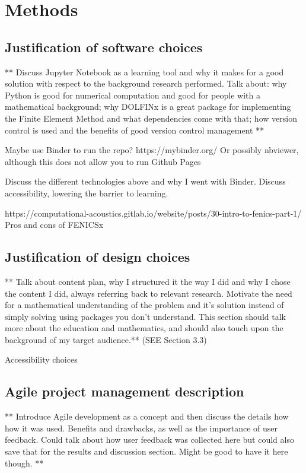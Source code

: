 \chapter{Methods}
\label{chapter2}


\section{Justification of software choices}
** Discuss Jupyter Notebook as a learning tool and why it makes for a good solution with respect to the background research performed. Talk about: why Python is good for numerical computation and good for people with a mathematical background; why DOLFINx is a great package for implementing the Finite Element Method and what dependencies come with that; how version control is used and the benefits of good version control management **

Maybe use Binder to run the repo? https://mybinder.org/
Or possibly nbviewer, although this does not allow you to run
Github Pages

Discuss the different technologies above and why I went with Binder. Discuss accessibility, lowering the barrier to learning.

https://computational-acoustics.gitlab.io/website/posts/30-intro-to-fenics-part-1/ Pros and cons of FENICSx

\section{Justification of design choices}
** Talk about content plan, why I structured it the way I did and why I chose the content I did, always referring back to relevant research. Motivate the need for a mathematical understanding of the problem and it's solution instead of simply solving using packages you don't understand. This section should talk more about the education and mathematics, and should also touch upon the background of my target audience.** (SEE Section 3.3)

Accessibility choices

\section{Agile project management description}
** Introduce Agile development as a concept and then discuss the details how how it was used. Benefits and drawbacks, as well as the importance of user feedback. Could talk about how user feedback was collected here but could also save that for the results and discussion section. Might be good to have it here though. **
